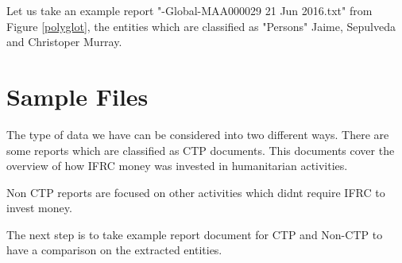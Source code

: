 Let us take an example report "-Global-MAA000029 21 Jun 2016.txt" from Figure \ref{polyglot}, the entities which are classified as "Persons" Jaime, Sepulveda and  Christoper Murray.

\section{Sample Files} 
The type of data we have can be considered into two different ways. There are some reports which are classified as CTP documents. This documents cover the overview of how IFRC money was invested in humanitarian activities.

Non CTP reports are focused on other activities which didnt require IFRC to invest money. 

The next step is to take example report document for CTP and Non-CTP to have a comparison on the extracted entities.  








































